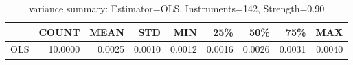 \begin{table}[ht]
\centering
\caption{variance summary: Estimator=OLS, Instruments=142, Strength=0.90}
\begin{tabular}{lrrrrrrrr}
\toprule
 & COUNT & MEAN & STD & MIN & 25\% & 50\% & 75\% & MAX \\
\midrule
OLS & 10.0000 & 0.0025 & 0.0010 & 0.0012 & 0.0016 & 0.0026 & 0.0031 & 0.0040 \\
\bottomrule
\end{tabular}
\end{table}
